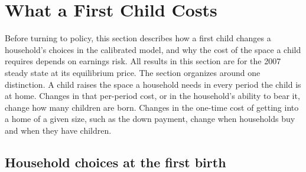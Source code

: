 \providecommand{\mocktodo}[1]{\textcolor{red}{[TODO: #1]}}

\section{What a First Child Costs}
\label{sec:results}

Before turning to policy, this section describes how a first child changes a
household's choices in the calibrated model, and why the cost of the space a
child requires depends on earnings risk. All results in this section are for
the 2007 steady state at its equilibrium price. The section organizes around
one distinction. A child raises the space a household needs in every period
the child is at home. Changes in that per-period cost, or in the household's
ability to bear it, change how many children are born. Changes in the one-time
cost of getting into a home of a given size, such as the down payment, change
when households buy and when they have children.

\subsection{Household choices at the first birth}
\label{sec:results-policy-functions}

